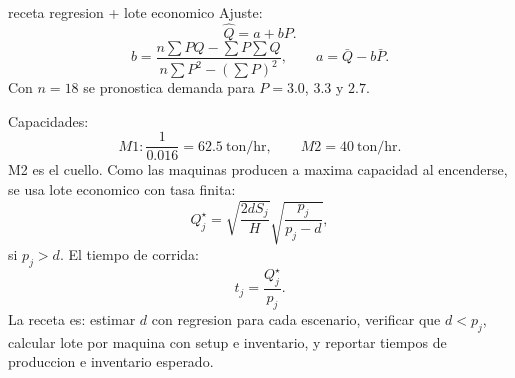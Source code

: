 \begin{pautacompleta}{receta regresion + lote economico}
Ajuste:
\[
  \hat Q=a+bP.
\]
\[
  b=\frac{n\sum PQ-\sum P\sum Q}{n\sum P^2-(\sum P)^2},
  \qquad
  a=\bar Q-b\bar P.
\]
Con $n=18$ se pronostica demanda para $P=3.0$, $3.3$ y $2.7$.

Capacidades:
\[
  M1:\frac{1}{0.016}=62.5\ \text{ton/hr},\qquad M2=40\ \text{ton/hr}.
\]
M2 es el cuello. Como las maquinas producen a maxima capacidad al encenderse, se usa lote economico con tasa finita:
\[
  Q_j^\star=\sqrt{\frac{2dS_j}{H}}\sqrt{\frac{p_j}{p_j-d}},
\]
si $p_j>d$. El tiempo de corrida:
\[
  t_j=\frac{Q_j^\star}{p_j}.
\]
La receta es: estimar $d$ con regresion para cada escenario, verificar que $d<p_j$, calcular lote por maquina con setup e inventario, y reportar tiempos de produccion e inventario esperado.
\end{pautacompleta}
